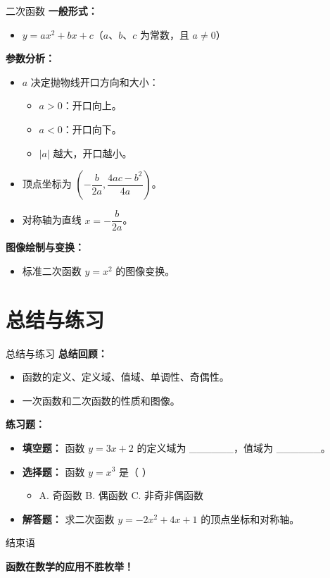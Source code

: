 \documentclass[aspectratio=169]{ctexbeamer} %
\begin{document}
\begin{frame}{二次函数}
    \textbf{一般形式：}
    \begin{itemize}
        \item \( y = ax^2 + bx + c \)（\( a \)、\( b \)、\( c \) 为常数，且 \( a \neq 0 \)）
    \end{itemize}

    \vspace{0.5cm}
    \textbf{参数分析：}
    \begin{itemize}
        \item \( a \) 决定抛物线开口方向和大小：
        \begin{itemize}
            \item \( a > 0 \)：开口向上。
            \item \( a < 0 \)：开口向下。
            \item \( |a| \) 越大，开口越小。
        \end{itemize}
        \item 顶点坐标为 \( \left( -\dfrac{b}{2a}, \dfrac{4ac - b^2}{4a} \right) \)。
        \item 对称轴为直线 \( x = -\dfrac{b}{2a} \)。
    \end{itemize}

    \vspace{0.5cm}
    \textbf{图像绘制与变换：}
    \begin{itemize}
        \item 标准二次函数 \( y = x^2 \) 的图像变换。
    \end{itemize}
\end{frame}

\section{总结与练习}
\begin{frame}{总结与练习}
    \textbf{总结回顾：}
    \begin{itemize}
        \item 函数的定义、定义域、值域、单调性、奇偶性。
        \item 一次函数和二次函数的性质和图像。
    \end{itemize}

    \vspace{0.5cm}
    \textbf{练习题：}
    \begin{itemize}
        \item \textbf{填空题：} 函数 \( y = 3x + 2 \) 的定义域为 \_\_\_\_\_\_，值域为 \_\_\_\_\_\_。
        \item \textbf{选择题：} 函数 \( y = x^3 \) 是（  ）
        \begin{itemize}
            \item A. 奇函数  B. 偶函数  C. 非奇非偶函数
        \end{itemize}
        \item \textbf{解答题：} 求二次函数 \( y = -2x^2 + 4x + 1 \) 的顶点坐标和对称轴。
    \end{itemize}
\end{frame}

\begin{frame}{结束语}
    \begin{center}
        \textbf{函数在数学的应用不胜枚举！} \\
    \end{center}
\end{frame}
\end{document}

